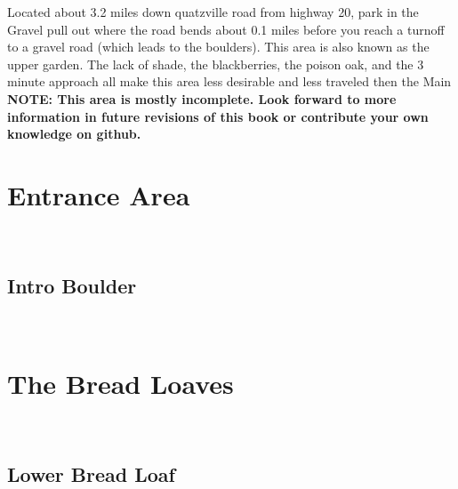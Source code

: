 \raggedcolumns
\begin{multicols}{2}
\begin{minipage}{\columnwidth}
Located about 3.2 miles down quatzville road from highway 20, park in the Gravel pull out where the road bends about 0.1 miles before you reach a turnoff to a gravel road (which leads to the boulders). This area is also known as the upper garden. The lack of shade, the blackberries, the poison oak, and the 3 minute approach all make this area less desirable and less traveled then the Main
\newline
\textbf{NOTE: This area is mostly incomplete. Look forward to more information in future revisions of this book or contribute your own knowledge on github.}
\end{minipage}

\newpage
		\section{Entrance Area}\label{sa:Entrance Area}
	\begin{minipage}{\columnwidth}
	\
	\end{minipage}
	
			\begin{minipage}{\columnwidth}
			\subsection*{Intro Boulder}\label{bf:Intro Boulder}
			\
			
			\end{minipage}
			
\newpage
		\section{The Bread Loaves}\label{sa:The Bread Loaves}
	\begin{minipage}{\columnwidth}
	\
	\end{minipage}
	
			\begin{minipage}{\columnwidth}
			\subsection*{Lower Bread Loaf}\label{bf:Lower Bread Loaf}
			\
			

\end{minipage}
\end{multicols}
